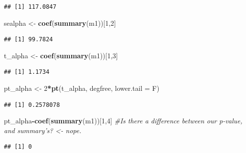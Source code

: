 \documentclass[
]{article}
\newenvironment{Shaded}{\begin{snugshade}}{\end{snugshade}}
\newcommand{\CommentTok}[1]{\textcolor[rgb]{0.56,0.35,0.01}{\textit{#1}}}
\newcommand{\DataTypeTok}[1]{\textcolor[rgb]{0.13,0.29,0.53}{#1}}
\newcommand{\DecValTok}[1]{\textcolor[rgb]{0.00,0.00,0.81}{#1}}
\newcommand{\KeywordTok}[1]{\textcolor[rgb]{0.13,0.29,0.53}{\textbf{#1}}}
\newcommand{\NormalTok}[1]{#1}
\newcommand{\OperatorTok}[1]{\textcolor[rgb]{0.81,0.36,0.00}{\textbf{#1}}}
\newcommand{\StringTok}[1]{\textcolor[rgb]{0.31,0.60,0.02}{#1}}
\begin{document}
\begin{verbatim}
## [1] 117.0847
\end{verbatim}

\begin{Shaded}
\begin{Highlighting}[]
\NormalTok{sealpha <-}\StringTok{ }\KeywordTok{coef}\NormalTok{(}\KeywordTok{summary}\NormalTok{(m1))[}\DecValTok{1}\NormalTok{,}\DecValTok{2}\NormalTok{]}
\end{Highlighting}
\end{Shaded}

\begin{verbatim}
## [1] 99.7824
\end{verbatim}

\begin{Shaded}
\begin{Highlighting}[]
\NormalTok{t_alpha <-}\StringTok{ }\KeywordTok{coef}\NormalTok{(}\KeywordTok{summary}\NormalTok{(m1))[}\DecValTok{1}\NormalTok{,}\DecValTok{3}\NormalTok{]}
\end{Highlighting}
\end{Shaded}

\begin{verbatim}
## [1] 1.1734
\end{verbatim}

\begin{Shaded}
\begin{Highlighting}[]
\NormalTok{pt_alpha <-}\StringTok{ }\DecValTok{2}\OperatorTok{*}\KeywordTok{pt}\NormalTok{(t_alpha, degfree, }\DataTypeTok{lower.tail =}\NormalTok{ F)}
\end{Highlighting}
\end{Shaded}

\begin{verbatim}
## [1] 0.2578078
\end{verbatim}

\begin{Shaded}
\begin{Highlighting}[]
\NormalTok{pt_alpha}\OperatorTok{-}\KeywordTok{coef}\NormalTok{(}\KeywordTok{summary}\NormalTok{(m1))[}\DecValTok{1}\NormalTok{,}\DecValTok{4}\NormalTok{] }\CommentTok{#Is there a difference between our p-value, and summary's? <- nope.}
\end{Highlighting}
\end{Shaded}

\begin{verbatim}
## [1] 0
\end{verbatim}
\end{document}
